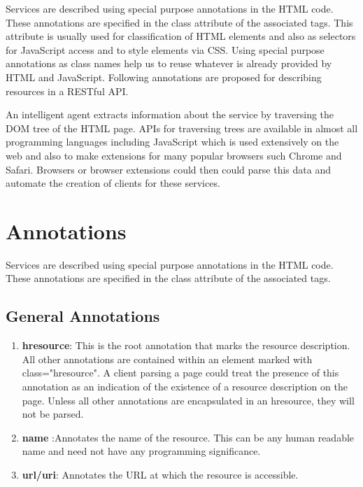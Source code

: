 \begin{spacing}{1.5}
Services are described using special purpose annotations in the HTML code. These annotations are specified in the class attribute of the associated tags. This attribute is usually used for classification of HTML elements and also as selectors for JavaScript access and to style elements via CSS. Using special purpose annotations as class names help us to reuse whatever is already provided by HTML and JavaScript. Following annotations are proposed for describing resources in a RESTful API.

An intelligent agent extracts information about the service by traversing the DOM tree of the HTML page. APIs for traversing trees are available in almost all programming languages including JavaScript which is used extensively on the web and also to make extensions for many popular browsers such Chrome and Safari. Browsers or browser extensions could then could parse this data and automate the creation of clients for these services.


\section{Annotations}

Services are described using special purpose annotations in the HTML code. These annotations are specified in the class attribute of the associated tags.

\subsection{General Annotations}
\begin{enumerate}

\item {\bf hresource}: This is the root annotation that marks the resource description. All other annotations are contained within an element marked with class="hresource". A client parsing a page could treat the presence of this annotation as an indication of the existence of a resource description on the page. Unless all other annotations are encapsulated in an hresource, they will not be parsed.

\item {\bf name} :Annotates the name of the resource. This can be any human readable name and need not have any programming significance.

\item {\bf url/uri}: Annotates the URL at which the resource is accessible.
\end{enumerate}


\end{spacing}
